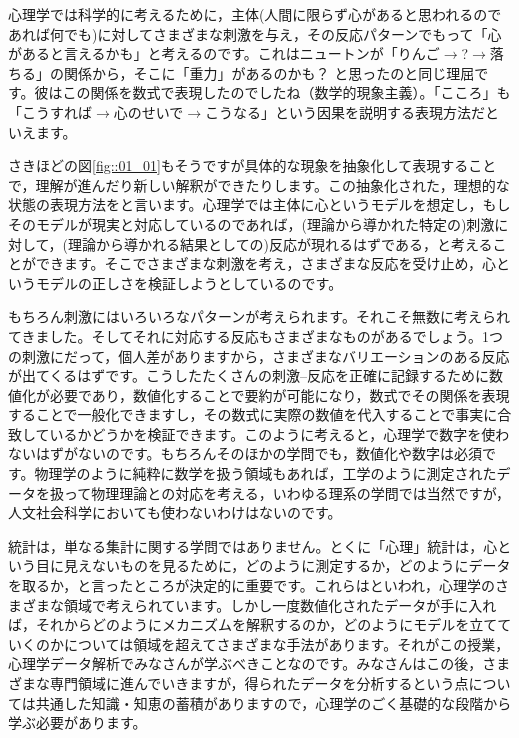 \documentclass{ltjsbook}
\begin{document}
心理学では科学的に考えるために，主体(人間に限らず心があると思われるのであれば何でも)に対してさまざまな刺激を与え，その反応パターンでもって「心があると言えるかも」と考えるのです。これはニュートンが「りんご$\to$?$\to$落ちる」の関係から，そこに「重力」があるのかも？ と思ったのと同じ理屈です。彼はこの関係を数式で表現したのでしたね（数学的現象主義）。「こころ」も「こうすれば$\to$心のせいで$\to$こうなる」という因果を説明する表現方法だといえます。

さきほどの図\ref{fig::01_01}もそうですが具体的な現象を抽象化して表現することで，理解が進んだり新しい解釈ができたりします。この抽象化された，理想的な状態の表現方法をと言います。心理学では主体に心というモデルを想定し，もしそのモデルが現実と対応しているのであれば，(理論から導かれた特定の)刺激に対して，(理論から導かれる結果としての)反応が現れるはずである，と考えることができます。そこでさまざまな刺激を考え，さまざまな反応を受け止め，心というモデルの正しさを検証しようとしているのです。

もちろん刺激にはいろいろなパターンが考えられます。それこそ無数に考えられてきました。そしてそれに対応する反応もさまざまなものがあるでしょう。1つの刺激にだって，個人差がありますから，さまざまなバリエーションのある反応が出てくるはずです。こうしたたくさんの刺激--反応を正確に記録するために数値化が必要であり，数値化することで要約が可能になり，数式でその関係を表現することで一般化できますし，その数式に実際の数値を代入することで事実に合致しているかどうかを検証できます。このように考えると，心理学で数字を使わないはずがないのです。もちろんそのほかの学問でも，数値化や数字は必須です。物理学のように純粋に数学を扱う領域もあれば，工学のように測定されたデータを扱って物理理論との対応を考える，いわゆる理系の学問では当然ですが，人文社会科学においても使わないわけはないのです。

統計は，単なる集計に関する学問ではありません。とくに「心理」統計は，心という目に見えないものを見るために，どのように測定するか，どのようにデータを取るか，と言ったところが決定的に重要です。これらはといわれ，心理学のさまざまな領域で考えられています。しかし一度数値化されたデータが手に入れば，それからどのようにメカニズムを解釈するのか，どのようにモデルを立てていくのかについては領域を超えてさまざまな手法があります。それがこの授業，心理学データ解析でみなさんが学ぶべきことなのです。みなさんはこの後，さまざまな専門領域に進んでいきますが，得られたデータを分析するという点については共通した知識・知恵の蓄積がありますので，心理学のごく基礎的な段階から学ぶ必要があります。
\end{document}

